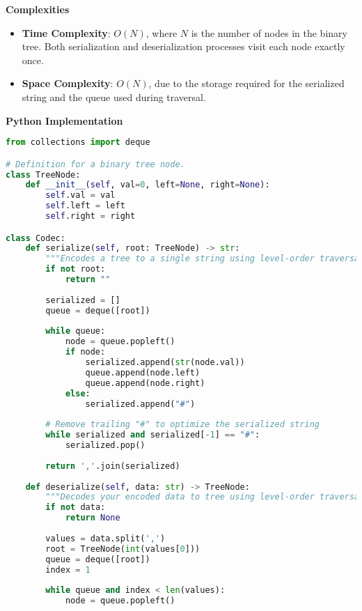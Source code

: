 \textbf{Complexities}

\begin{itemize}
    \item \textbf{Time Complexity}: \(O(N)\), where \(N\) is the number of nodes in the binary tree. Both serialization and deserialization processes visit each node exactly once.
    \item \textbf{Space Complexity}: \(O(N)\), due to the storage required for the serialized string and the queue used during traversal.
\end{itemize}

\textbf{Python Implementation}

\begin{lstlisting}[language=Python, xleftmargin=0.02\textwidth, xrightmargin=0.02\textwidth]
from collections import deque

# Definition for a binary tree node.
class TreeNode:
    def __init__(self, val=0, left=None, right=None):
        self.val = val
        self.left = left
        self.right = right

class Codec:
    def serialize(self, root: TreeNode) -> str:
        """Encodes a tree to a single string using level-order traversal."""
        if not root:
            return ""
        
        serialized = []
        queue = deque([root])
        
        while queue:
            node = queue.popleft()
            if node:
                serialized.append(str(node.val))
                queue.append(node.left)
                queue.append(node.right)
            else:
                serialized.append("#")
        
        # Remove trailing "#" to optimize the serialized string
        while serialized and serialized[-1] == "#":
            serialized.pop()
        
        return ','.join(serialized)
    
    def deserialize(self, data: str) -> TreeNode:
        """Decodes your encoded data to tree using level-order traversal."""
        if not data:
            return None
        
        values = data.split(',')
        root = TreeNode(int(values[0]))
        queue = deque([root])
        index = 1
        
        while queue and index < len(values):
            node = queue.popleft()
            

\end{lstlisting}
